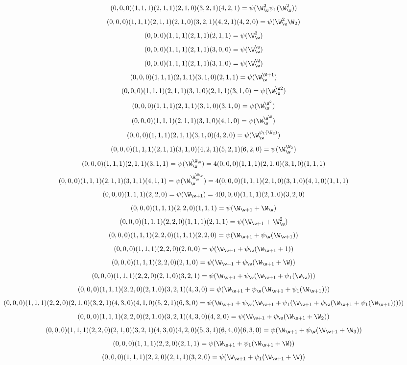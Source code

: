\[(0,0,0)(1,1,1)(2,1,1)(2,1,0)(3,2,1)(4,2,1) = \psi(\W_\w^2 \psi_1(\W_\w^2))\]
\[(0,0,0)(1,1,1)(2,1,1)(2,1,0)(3,2,1)(4,2,1)(4,2,0) = \psi(\W_\w^2\W_2)\]
\[(0,0,0)(1,1,1)(2,1,1)(2,1,1) = \psi(\W_\w^3)\]
\[(0,0,0)(1,1,1)(2,1,1)(3,0,0) = \psi(\W_\w^\w)\]
\[(0,0,0)(1,1,1)(2,1,1)(3,1,0) = \psi(\W_\w^\W)\]
\[(0,0,0)(1,1,1)(2,1,1)(3,1,0)(2,1,1) = \psi(\W_\w^{\W+1})\]
\[(0,0,0)(1,1,1)(2,1,1)(3,1,0)(2,1,1)(3,1,0) = \psi(\W_\w^{\W2})\]
\[(0,0,0)(1,1,1)(2,1,1)(3,1,0)(3,1,0) = \psi(\W_\w^{\W^2})\]
\[(0,0,0)(1,1,1)(2,1,1)(3,1,0)(4,1,0) = \psi(\W_\w^{\W^\W})\]
\[(0,0,0)(1,1,1)(2,1,1)(3,1,0)(4,2,0) = \psi(\W_\w^{\psi_1(\W_2)})\]
\[(0,0,0)(1,1,1)(2,1,1)(3,1,0)(4,2,1)(5,2,1)(6,2,0) = \psi(\W_\w^{\W_2})\]
\[(0,0,0)(1,1,1)(2,1,1)(3,1,1) = \psi(\W_\w^{\W_\w})=4(0,0,0)(1,1,1)(2,1,0)(3,1,0)(1,1,1)\]
\[(0,0,0)(1,1,1)(2,1,1)(3,1,1)(4,1,1) = \psi(\W_\w^{\W_\w^{\W_\w}})=4(0,0,0)(1,1,1)(2,1,0)(3,1,0)(4,1,0)(1,1,1)\]
\[(0,0,0)(1,1,1)(2,2,0) = \psi(\W_{\w+1})=4(0,0,0)(1,1,1)(2,1,0)(3,2,0)\]
\[(0,0,0)(1,1,1)(2,2,0)(1,1,1) = \psi(\W_{\w+1}+\W_\w)\]
\[(0,0,0)(1,1,1)(2,2,0)(1,1,1)(2,1,1) = \psi(\W_{\w+1}+\W_\w^2)\]
\[(0,0,0)(1,1,1)(2,2,0)(1,1,1)(2,2,0) = \psi(\W_{\w+1}+\psi_\w(\W_{\w+1}))\]
\[(0,0,0)(1,1,1)(2,2,0)(2,0,0) = \psi(\W_{\w+1}+\psi_\w(\W_{\w+1}+1))\]
\[(0,0,0)(1,1,1)(2,2,0)(2,1,0) = \psi(\W_{\w+1}+\psi_\w(\W_{\w+1}+\W))\]
\[(0,0,0)(1,1,1)(2,2,0)(2,1,0)(3,2,1) = \psi(\W_{\w+1}+\psi_\w(\W_{\w+1}+\psi_1(\W_\w)))\]
\[(0,0,0)(1,1,1)(2,2,0)(2,1,0)(3,2,1)(4,3,0) = \psi(\W_{\w+1}+\psi_\w(\W_{\w+1}+\psi_1(\W_{\w+1})))\]
\[(0,0,0)(1,1,1)(2,2,0)(2,1,0)(3,2,1)(4,3,0)(4,1,0)(5,2,1)(6,3,0) = \psi(\W_{\w+1}+\psi_\w(\W_{\w+1}+\psi_1(\W_{\w+1}+\psi_\w(\W_{\w+1}+\psi_1(\W_{\w+1})))))\]
\[(0,0,0)(1,1,1)(2,2,0)(2,1,0)(3,2,1)(4,3,0)(4,2,0) = \psi(\W_{\w+1}+\psi_\w(\W_{\w+1}+\W_2))\]
\[(0,0,0)(1,1,1)(2,2,0)(2,1,0)(3,2,1)(4,3,0)(4,2,0)(5,3,1)(6,4,0)(6,3,0) = \psi(\W_{\w+1}+\psi_\w(\W_{\w+1}+\W_3))\]
\[(0,0,0)(1,1,1)(2,2,0)(2,1,1) = \psi(\W_{\w+1}+\psi_1(\W_{\w+1}+\W))\]
\[(0,0,0)(1,1,1)(2,2,0)(2,1,1)(3,2,0) = \psi(\W_{\w+1}+\psi_1(\W_{\w+1}+\W))\]